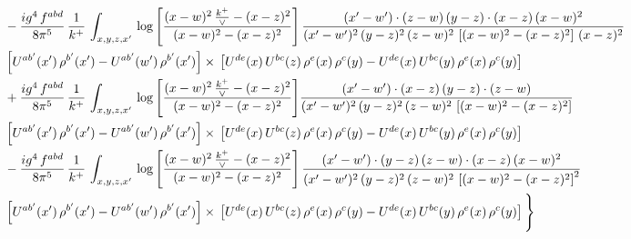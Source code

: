 \documentclass[10pt]{article}
\numberwithin{equation}{section}
\begin{document}
\begin{align}
& - \frac{ig^{4}\, f^{abd}}{8\pi^{5}}\, \frac{1}{k^{+}}\, \int_{x,y,z,x'}\,\log{\left[\frac{(x-w)^{2}\,\frac{k^{+}}{\vee}-(x-z)^{2}}{(x-w)^{2}-(x-z)^{2}}\right]}\,\frac{(x'-w')\cdot (z-w)\, (y-z)\cdot (x-z)\, (x-w)^{2}}{(x'-w')^{2}\, (y-z)^{2}\, (z-w)^{2}\,\left[(x-w)^{2} - (x-z)^{2}\right]\, (x-z)^{2}}\, \notag \\ & \left[U^{ab'}(x')\,\rho^{b'}(x')-U^{ab'}(w')\, \rho^{b'}(x')\right]\times\,\left[U^{de}(x)\,U^{bc}(z)\, \rho^{e}(x)\,\rho^{c}(y)-U^{de}(x)\,U^{bc}(y)\,\rho^{e}(x)\,\rho^{c}(y)\right] \notag \\
& +\frac{ig^{4}\, f^{abd}}{8\pi^{5}}\, \frac{1}{k^{+}}\, \int_{x,y,z,x'}\,\log{\left[\frac{(x-w)^{2}\,\frac{k^{+}}{\vee}-(x-z)^{2}}{(x-w)^{2}-(x-z)^{2}}\right]}\frac{(x'-w')\cdot (x-z)\, (y-z)\cdot (z-w)}{(x'-w')^{2}\, (y-z)^{2}\, (z-w)^{2}\,\left[(x-w)^{2} -(x-z)^{2}\right]}\, \notag \\ & \left[U^{ab'}(x')\,\rho^{b'}(x')-U^{ab'}(w')\, \rho^{b'}(x')\right]\times\,\left[U^{de}(x)\,U^{bc}(z)\, \rho^{e}(x)\,\rho^{c}(y)-U^{de}(x)\,U^{bc}(y)\,\rho^{e}(x)\,\rho^{c}(y)\right] \notag \\
& -\frac{ig^{4}\, f^{abd}}{8\pi^{5}}\, \frac{1}{k^{+}}\, \int_{x,y,z,x'}\,\log{\left[\frac{(x-w)^{2}\,\frac{k^{+}}{\vee}-(x-z)^{2}}{(x-w)^{2}-(x-z)^{2}}\right]}\,\frac{(x'-w')\cdot (y-z)\, (z-w)\cdot (x-z)\,(x-w)^{2}}{(x'-w')^{2}\, (y-z)^{2}\, (z-w)^{2}\,\left[(x-w)^{2}-(x-z)^{2}\right]^{2}}\, \notag \\ & \left[U^{ab'}(x')\,\rho^{b'}(x')-U^{ab'}(w')\, \rho^{b'}(x')\right]\times\,\left[U^{de}(x)\,U^{bc}(z)\, \rho^{e}(x)\,\rho^{c}(y)-U^{de}(x)\,U^{bc}(y)\,\rho^{e}(x)\,\rho^{c}(y)\right]\Bigg\}
\end{align}
\end{document}
